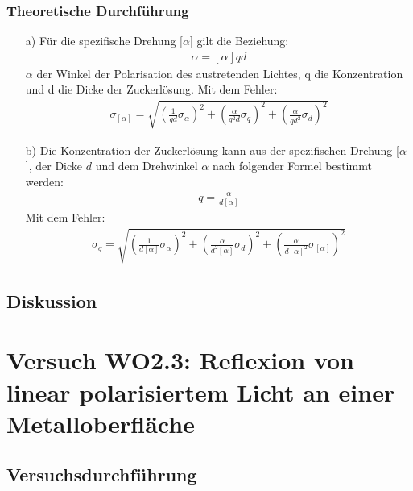 \documentclass[12pt]{scrartcl}
\begin{document}
\subsubsection{Theoretische Durchführung}
\begin{enumerate}
\item[a)] Für die spezifische Drehung [$\alpha$] gilt die Beziehung:
\begin{align}
\alpha = [\alpha] q d
\end{align}
$\alpha$ der Winkel der Polarisation des austretenden Lichtes, q die Konzentration und d die Dicke der Zuckerlösung.
Mit dem Fehler:
\begin{align}
\sigma_{[\alpha]} = \sqrt{
\left(\frac{1}{q d}\sigma_{\alpha}\right)^2+
\left(\frac{\alpha}{q^2 d}\sigma_q\right)^2+
\left(\frac{\alpha}{q d^2}\sigma_d\right)^2}
\end{align}
\item[b)]
Die Konzentration der Zuckerlösung kann aus der spezifischen Drehung [$\alpha$], der Dicke $d$ und dem Drehwinkel $\alpha$ nach folgender Formel bestimmt werden:
\begin{align}
q = \frac{\alpha}{d [\alpha]}
\end{align}
Mit dem Fehler:
\begin{align}
\sigma_q = \sqrt{
\left(\frac{1}{d [\alpha]}\sigma_\alpha \right)^2+
\left(\frac{\alpha}{d^2 [\alpha]}\sigma_d \right)^2+
\left(\frac{\alpha}{d [\alpha]^2}\sigma_{[\alpha]}\right)^2}
\end{align}
\end{enumerate}
\subsection{Diskussion}

\section{Versuch WO2.3:
Reflexion von linear polarisiertem Licht an einer Metalloberfläche}
\subsection{Versuchsdurchführung}
\end{document}
